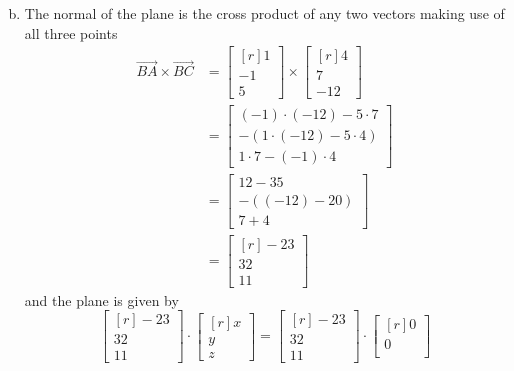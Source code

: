 \documentclass[../main.tex]{subfiles}
\begin{document}
\solution
\begin{enumerate}[a)]
	\setcounter{enumi}{1}
	\item The normal of the plane is the cross product of any two vectors making use of all three points
		\begin{align*}
			\overrightarrow{BA}\times\overrightarrow{BC}
			&=
			\begin{bmatrix*}[r]1\\-1\\5\end{bmatrix*}
			\times
			\begin{bmatrix*}[r]4\\7\\-12\end{bmatrix*}
			\\&=
			\begin{bmatrix}
				(-1)\cdot(-12) - 5\cdot7 \\
				-(1\cdot(-12) - 5\cdot4) \\
				1\cdot7 - (-1)\cdot4
			\end{bmatrix}
			\\&=
			\begin{bmatrix}
				12 - 35 \\
				-((-12) - 20) \\
				7 + 4
			\end{bmatrix}
			\\&=
			\begin{bmatrix*}[r]
				-23 \\
				32 \\
				11
			\end{bmatrix*}
		\end{align*}
		and the plane is given by
		\[
			\begin{bmatrix*}[r]
				-23 \\
				32 \\
				11
			\end{bmatrix*}
			\cdot
			\begin{bmatrix*}[r]
				x \\
				y \\
				z
			\end{bmatrix*}
			=
			\begin{bmatrix*}[r]
				-23 \\
				32 \\
				11
			\end{bmatrix*}
			\cdot
			\begin{bmatrix*}[r]
				0 \\
				0 \\

\end{bmatrix*}\]
\end{enumerate}
\end{document}
